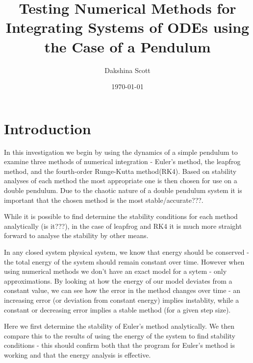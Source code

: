 \documentclass[a4paper,11pt,twoside]{article}
\begin{document}
\title{Testing Numerical Methods for Integrating Systems of ODEs using 
the Case of a Pendulum}
\author{Dakshina Scott}
\date{\today}
\maketitle

\begin{abstract}

\end{abstract}


\tableofcontents


\section{Introduction}
In this investigation we begin by using the dynamics of a simple 
pendulum to examine three methods of numerical integration - Euler's
method, the leapfrog method, and the fourth-order Runge-Kutta 
method(RK4). Based on stability analyses of each method the most 
appropriate one is then chosen for use on a double pendulum. Due to the 
chaotic nature of a double pendulum system it is important that 
the chosen method is the most stable/accurate???. 

While it is possible to find determine the stability conditions for 
each method analytically (is it???), in the case of leapfrog and RK4 
it is much more straight forward to analyse the stability by other means.

In any closed system physical system, we know that energy 
should be conserved - the total energy of the system should remain 
constant over time. However when using numerical methods we don't have 
an exact model for a sytem - only approximations. By looking at 
how the energy of our model deviates from a constant value, we can see 
how the error in the method changes over time - an increasing error 
(or deviation from constant energy) implies instablity, while a constant 
or decreasing error implies a stable method (for a given step size).

Here we first determine the stability of Euler's method analytically. 
We then compare this to the results of using the energy of the system 
to find stability conditions - this should confirm both that the program 
for Euler's method is working and that the energy analysis is effective.
\end{document}
